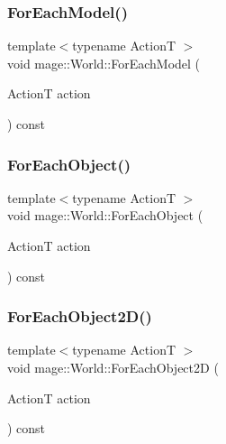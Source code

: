 \subsubsection{\texorpdfstring{For\+Each\+Model()}{ForEachModel()}}
{\footnotesize\ttfamily template$<$typename ActionT $>$ \\
void mage\+::\+World\+::\+For\+Each\+Model (\begin{DoxyParamCaption}\item[{ActionT}]{action }\end{DoxyParamCaption}) const}

\hypertarget{classmage_1_1_world_a9bb9af95395546e334609473dda0854c}{}\label{classmage_1_1_world_a9bb9af95395546e334609473dda0854c} 
\subsubsection{\texorpdfstring{For\+Each\+Object()}{ForEachObject()}}
{\footnotesize\ttfamily template$<$typename ActionT $>$ \\
void mage\+::\+World\+::\+For\+Each\+Object (\begin{DoxyParamCaption}\item[{ActionT}]{action }\end{DoxyParamCaption}) const}

\hypertarget{classmage_1_1_world_ae8293799bc02d12c7a48e248bcc3eb33}{}\label{classmage_1_1_world_ae8293799bc02d12c7a48e248bcc3eb33} 
\subsubsection{\texorpdfstring{For\+Each\+Object2\+D()}{ForEachObject2D()}}
{\footnotesize\ttfamily template$<$typename ActionT $>$ \\
void mage\+::\+World\+::\+For\+Each\+Object2D (\begin{DoxyParamCaption}\item[{ActionT}]{action }\end{DoxyParamCaption}) const}

\hypertarget{classmage_1_1_world_aeaf99d59687121c072d483a98a726eff}{}\label{classmage_1_1_world_aeaf99d59687121c072d483a98a726eff} 
